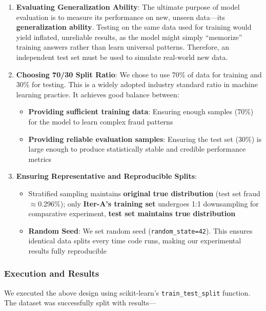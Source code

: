 \documentclass[sigplan,screen]{acmart}
\begin{document}
\begin{enumerate}
\item \textbf{Evaluating Generalization Ability}: The ultimate purpose of model evaluation is to measure its performance on new, unseen data---its \textbf{generalization ability}. Testing on the same data used for training would yield inflated, unreliable results, as the model might simply ``memorize'' training answers rather than learn universal patterns. Therefore, an independent test set must be used to simulate real-world new data.

\item \textbf{Choosing 70/30 Split Ratio}: We chose to use 70\% of data for training and 30\% for testing. This is a widely adopted industry standard ratio in machine learning practice. It achieves good balance between:
\begin{itemize}
    \item \textbf{Providing sufficient training data}: Ensuring enough samples (70\%) for the model to learn complex fraud patterns
    \item \textbf{Providing reliable evaluation samples}: Ensuring the test set (30\%) is large enough to produce statistically stable and credible performance metrics
\end{itemize}

\item \textbf{Ensuring Representative and Reproducible Splits}:
\begin{itemize}
    \item Stratified sampling maintains \textbf{original true distribution} (test set fraud $\approx$0.296\%); only \textbf{Iter-A's training set} undergoes 1:1 downsampling for comparative experiment, \textbf{test set maintains true distribution}
    \item \textbf{Random Seed}: We set random seed (\texttt{random\_state=42}). This ensures identical data splits every time code runs, making our experimental results fully reproducible
\end{itemize}
\end{enumerate}

\subsubsection{Execution and Results}

We executed the above design using scikit-learn's \texttt{train\_test\_split} function. The dataset was successfully split with results---
\end{document}
